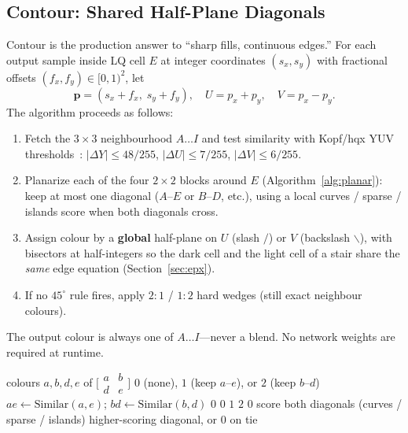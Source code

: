 \documentclass[conference]{IEEEtran}
\begin{document}
\subsection{Contour: Shared Half-Plane Diagonals}
\label{sec:contour}
Contour is the production answer to ``sharp fills, continuous edges.'' For each
output sample inside LQ cell $E$ at integer coordinates $(s_x,s_y)$ with
fractional offsets $(f_x,f_y)\in[0,1)^2$, let
\begin{equation}
  \mathbf{p} = (s_x+f_x,\; s_y+f_y),\quad
  U = p_x + p_y,\quad
  V = p_x - p_y.
\end{equation}
The algorithm proceeds as follows:
\begin{enumerate}
  \item Fetch the $3{\times}3$ neighbourhood $A{\ldots}I$ and test similarity
        with Kopf/hqx YUV thresholds~\cite{kopf2011}:
        $|\Delta Y|\le 48/255$, $|\Delta U|\le 7/255$, $|\Delta V|\le 6/255$.
  \item Planarize each of the four $2{\times}2$ blocks around $E$
        (Algorithm~\ref{alg:planar}): keep at most one diagonal
        ($A$--$E$ or $B$--$D$, etc.), using a local curves / sparse / islands
        score when both diagonals cross.
  \item Assign colour by a \textbf{global} half-plane on $U$ (slash $/$) or
        $V$ (backslash $\backslash$), with bisectors at half-integers so the
        dark cell and the light cell of a stair share the \emph{same} edge
        equation (Section~\ref{sec:epx}).
  \item If no $45^\circ$ rule fires, apply $2{:}1$ / $1{:}2$ hard wedges
        (still exact neighbour colours).
\end{enumerate}
The output colour is always one of $A{\ldots}I$---never a blend. No network
weights are required at runtime.

\begin{algorithm}[t]
\caption{Planar diagonal selection in a $2{\times}2$ block.}
\label{alg:planar}
\begin{algorithmic}[1]
\REQUIRE colours $a,b,d,e$ of
$\bigl[\begin{smallmatrix}a&b\\d&e\end{smallmatrix}\bigr]$
\ENSURE $0$ (none), $1$ (keep $a$--$e$), or $2$ (keep $b$--$d$)
\STATE $ae \leftarrow \mathrm{Similar}(a,e)$;\;
       $bd \leftarrow \mathrm{Similar}(b,d)$
  \RETURN $0$
\ENDIF
{}
  \RETURN $0$ 
\ENDIF
{}
  \RETURN $1$
\ENDIF
{}
  \RETURN $2$
\ENDIF
{}
  \RETURN $0$ 
\ENDIF
\STATE score both diagonals (curves / sparse / islands)
\RETURN higher-scoring diagonal, or $0$ on tie
\end{algorithmic}
\end{algorithm}
\end{document}
